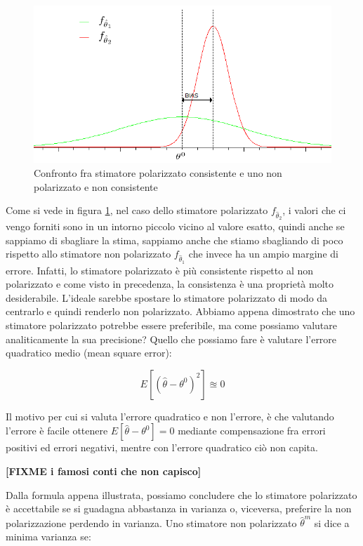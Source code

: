 \begin{figure}[htbp]
  \centering
  \includegraphics[scale=0.5]{img/npfm.png}
  \caption{Confronto fra stimatore polarizzato consistente e uno non polarizzato e non consistente\label{fig:confrontopolarizzazioneconsistenza}}
\end{figure}

Come si vede in figura \ref{fig:confrontopolarizzazioneconsistenza}, nel caso dello stimatore polarizzato $f_{\hat{\theta}_2}$, i valori che ci vengo forniti sono in un intorno piccolo vicino al valore esatto, quindi anche se sappiamo di sbagliare la stima, sappiamo anche che stiamo sbagliando di poco rispetto allo stimatore non polarizzato $f_{\hat{\theta}_1}$ che invece ha un ampio margine di errore. Infatti, lo stimatore polarizzato è più consistente rispetto al non polarizzato e come visto in precedenza, la consistenza è una proprietà molto desiderabile. L'ideale sarebbe spostare lo stimatore polarizzato di modo da centrarlo e quindi renderlo non polarizzato.\newline
Abbiamo appena dimostrato che uno stimatore polarizzato potrebbe essere preferibile, ma come possiamo valutare analiticamente la sua precisione? Quello che possiamo fare è valutare l'errore quadratico medio (mean square error):

    \[ E[(\hat{\theta}-\theta^0)^2] \approxeq 0\]

Il motivo per cui si valuta l'errore quadratico e non l'errore, è che valutando l'errore è facile ottenere $E[\hat{\theta}-\theta^0]=0$ mediante compensazione fra errori positivi ed errori negativi, mentre con l'errore quadratico ciò non capita.\newline
    \begin{center}
    \textbf{[FIXME i famosi conti che non capisco]}
    \end{center}
Dalla formula appena illustrata, possiamo concludere che lo stimatore polarizzato è accettabile se si guadagna abbastanza in varianza o, viceversa, preferire la non polarizzazione perdendo in varianza. Uno stimatore non polarizzato $\hat{\theta}^m$ si dice a minima varianza  se:

